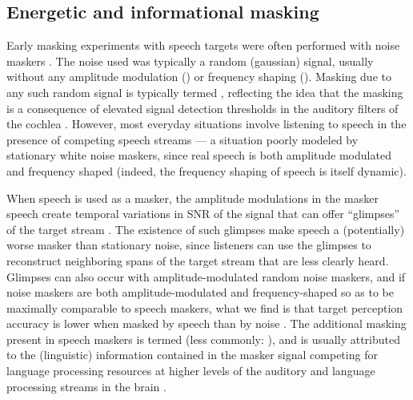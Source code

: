 \subsection{Energetic and informational masking}
Early masking experiments with speech targets were often performed with noise maskers \citep[e.g.,][]{HawkinsStevens1950,Tolhurst1957b,PollackPickett1958}.  The noise used was typically a random (gaussian) signal, usually without any amplitude modulation () or frequency shaping ().  Masking due to any such random signal is typically termed , reflecting the idea that the masking is a consequence of elevated signal detection thresholds in the auditory filters of the cochlea \citep{DurlachEtAl2003a,xxx}.  %
However, most everyday situations involve listening to speech in the presence of competing speech streams — a situation poorly modeled by stationary white noise maskers, since real speech is both amplitude modulated and frequency shaped (indeed, the frequency shaping of speech is itself dynamic).

When speech is used as a masker, the amplitude modulations in the masker speech create temporal variations in SNR of the signal that can offer “glimpses” of the target stream \citep{FestenPlomp1990}.  The existence of such glimpses make speech a (potentially) worse masker than stationary noise, since listeners can use the glimpses to reconstruct neighboring spans of the target stream that are less clearly heard.\footnotemark{}  Glimpses can also occur with amplitude-modulated random noise maskers, and if noise maskers are both amplitude-modulated and frequency-shaped so as to be maximally comparable to speech maskers, what we find is that target perception accuracy is lower when masked by speech than by noise \citep[e.g.,][]{CarhartEtAl1969,LewisEtAl1988,SimpsonCooke2005}.  The additional masking present in speech maskers is termed  (less commonly: ), and is usually attributed to the (linguistic) information contained in the masker signal competing for language processing resources at higher levels of the auditory and language processing streams in the brain \citep{DurlachEtAl2003a,xxx}.

